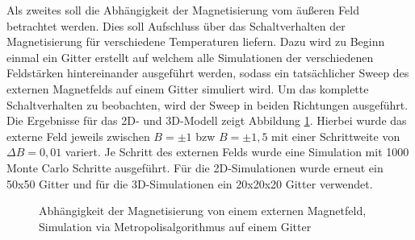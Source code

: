 Als zweites soll die Abhängigkeit der Magnetisierung vom äußeren Feld betrachtet werden. Dies soll Aufschluss über das Schaltverhalten der Magnetisierung für verschiedene Temperaturen liefern. Dazu wird zu Beginn einmal ein Gitter erstellt auf welchem alle Simulationen der verschiedenen Feldstärken hintereinander ausgeführt werden, sodass ein tatsächlicher Sweep des externen Magnetfelds auf einem Gitter simuliert wird. Um das komplette Schaltverhalten zu beobachten, wird der Sweep in beiden Richtungen ausgeführt. Die Ergebnisse für das 2D- und 3D-Modell zeigt Abbildung \ref{mpbsweep}. Hierbei wurde das externe Feld jeweils zwischen $B=\pm1$ bzw $B=\pm1,5$ mit einer Schrittweite von $\Delta B=0,01$ variert. Je Schritt des externen Felds wurde eine Simulation mit 1000 Monte Carlo Schritte ausgeführt. Für die 2D-Simulationen wurde erneut ein 50x50 Gitter und für die 3D-Simulationen ein 20x20x20 Gitter verwendet.
\begin{figure}[H]
	\centering
	\caption{Abhängigkeit der Magnetisierung von einem externen Magnetfeld, Simulation via Metropolisalgorithmus auf einem Gitter}
	\label{mpbsweep}
\end{figure}
